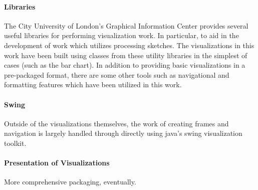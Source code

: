 \paragraph{Libraries}
The City University of London's Graphical Information Center provides several useful libraries for performing visualization work. In particular, to aid in the development of work which utilizes processing sketches. The visualizations in this work have been built using classes from these utility libraries in the simplest of cases (such as the bar chart). In addition to providing basic visualizations in a pre-packaged format, there are some other tools such as navigational and formatting features which have been utilized in this work.  

\paragraph{Swing}
Outside of the visualizations themselves, the work of creating frames and navigation is largely handled through directly using java's swing visualization toolkit.

\paragraph{Presentation of Visualizations}
More comprehensive packaging, eventually.

